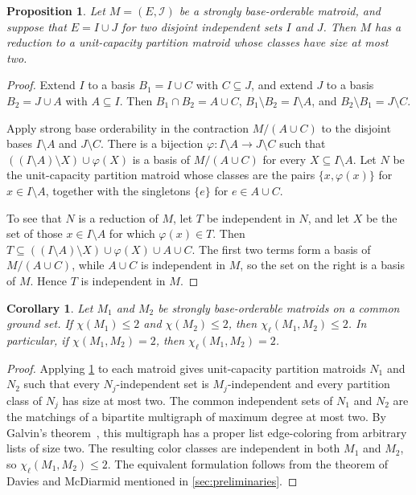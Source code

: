 \documentclass{article}
\theoremstyle{plain}
\newtheorem{cor}[thm]{Corollary}
\newtheorem{prop}[thm]{Proposition}
\theoremstyle{definition}
\newcommand{\cI}{\mathcal{I}}
\begin{document}
\begin{prop}\label{prop:reduction}
Let $M=(E,\cI)$ be a strongly base-orderable matroid, and suppose that $E=I\cup J$ for two disjoint independent sets $I$ and $J$. Then $M$ has a reduction to a unit-capacity partition matroid whose classes have size at most two.
\end{prop}

\begin{proof}
Extend $I$ to a basis $B_1=I\cup C$ with $C\subseteq J$, and extend $J$ to a basis $B_2=J\cup A$ with $A\subseteq I$. Then $B_1\cap B_2=A\cup C$, $B_1\setminus B_2=I\setminus A$, and $B_2\setminus B_1=J\setminus C$.

Apply strong base orderability in the contraction $M/(A\cup C)$ to the disjoint bases $I\setminus A$ and $J\setminus C$. There is a bijection $\varphi\colon I\setminus A\to J\setminus C$ such that $((I\setminus A)\setminus X)\cup\varphi(X)$ is a basis of $M/(A\cup C)$ for every $X\subseteq I\setminus A$. Let $N$ be the unit-capacity partition matroid whose classes are the pairs $\{x,\varphi(x)\}$ for $x\in I\setminus A$, together with the singletons $\{e\}$ for $e\in A\cup C$.

To see that $N$ is a reduction of $M$, let $T$ be independent in $N$, and let $X$ be the set of those $x\in I\setminus A$ for which $\varphi(x)\in T$. Then $T\subseteq ((I\setminus A)\setminus X)\cup\varphi(X)\cup A\cup C$. The first two terms form a basis of $M/(A\cup C)$, while $A\cup C$ is independent in $M$, so the set on the right is a basis of $M$. Hence $T$ is independent in $M$.
\end{proof}

\begin{cor}\label{cor:sbo}
Let $M_1$ and $M_2$ be strongly base-orderable matroids on a common ground set. If $\chi(M_1)\le2$ and $\chi(M_2)\le2$, then $\chi_\ell(M_1,M_2)\le2$. In particular, if $\chi(M_1,M_2)=2$, then $\chi_\ell(M_1,M_2)=2$.
\end{cor}

\begin{proof}
Applying \cref{prop:reduction} to each matroid gives unit-capacity partition matroids $N_1$ and $N_2$ such that every $N_j$-independent set is $M_j$-independent and every partition class of $N_j$ has size at most two. The common independent sets of $N_1$ and $N_2$ are the matchings of a bipartite multigraph of maximum degree at most two. By Galvin's theorem~\cite{galvin1995list}, this multigraph has a proper list edge-coloring from arbitrary lists of size two. The resulting color classes are independent in both $M_1$ and $M_2$, so $\chi_\ell(M_1,M_2)\le2$. The equivalent formulation follows from the theorem of Davies and McDiarmid mentioned in \cref{sec:preliminaries}.
\end{proof}
\end{document}
